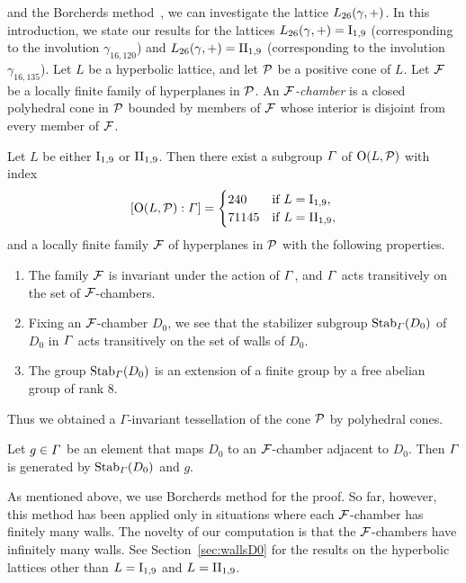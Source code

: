 \documentclass{amsart} %
\begin{document}
and the Borcherds method~\cite{MR913200, MR1654763},
we can investigate  %
the lattice $L_{26}(\gamma, +)$.
In this introduction, 
we state our results for the lattices $L_{26}(\gamma, +)=\mathrm{I}_{1,9}$ (corresponding to the involution $\gamma_{16,120}$) 
and $L_{26}(\gamma, +)=\mathrm{II}_{1,9}$ (corresponding to the involution $\gamma_{16,135}$).
Let $L$ be a hyperbolic lattice, 
and let $\mathord{\mathcal{P}}$ be a positive cone of $L$.
 Let $\mathord{\mathcal{F}}$ be a locally finite family of hyperplanes in $\mathord{\mathcal{P}}$. 
 An \emph{$\mathord{\mathcal{F}}$-chamber} is a closed polyhedral cone in $\mathord{\mathcal{P}}$ 
 bounded by members of $\mathord{\mathcal{F}}$ whose interior is disjoint from every member of $\mathord{\mathcal{F}}$.
%
%
\begin{theorem}\label{thm:main3}
Let $L$ be either $\mathrm{I}_{1,9}$ or $\mathrm{II}_{1,9}$. 
Then there exist a subgroup $\varGamma$ 
of $\mathord{\mathrm{O}}(L,\mathord{\mathcal{P}})$ with index 
\[
[\mathord{\mathrm{O}}(L,\mathord{\mathcal{P}}): \varGamma]=\begin{cases}
240 & \textrm{if $L=\mathrm{I}_{1,9}$}, \\
71145 & \textrm{if $L=\mathrm{II}_{1,9}$}, \\
\end{cases}
\]
and a locally finite family $\mathord{\mathcal{F}}$ of hyperplanes in $\mathord{\mathcal{P}}$ with the following properties.
\begin{enumerate}[label={\rm(\roman*)}]
%
\item The family $\mathord{\mathcal{F}}$ is invariant under the action of $\varGamma$, 
and $\varGamma$ acts transitively on the set of $\mathord{\mathcal{F}}$-chambers.
\item Fixing an $\mathord{\mathcal{F}}$-chamber $D_0$,
we see that the stabilizer subgroup $\operatorname{Stab}_{\varGamma}(D_0)$ of $D_0$ in $\varGamma$
 acts transitively on the set of walls of $D_0$.
 \item 
 The group 
 $\operatorname{Stab}_{\varGamma}(D_0)$ is an extension of a finite group by a free abelian group of rank $8$.
\end{enumerate}
\end{theorem}
%
Thus we obtained a $\Gamma$-invariant tessellation of the cone $\mathord{\mathcal{P}}$ by polyhedral cones.
%
\begin{corollary}\label{thm:CorOfmain3}
Let $g\in\varGamma$ be an element that maps $D_0$ to an $\mathord{\mathcal{F}}$-chamber adjacent to $D_0$. 
Then $\varGamma$ is generated by $\operatorname{Stab}_{\varGamma}(D_0)$ and $g$.
\end{corollary}
%
As mentioned above, we use  Borcherds method for the proof. 
So far, however,
 this method has been applied only in situations where each $\mathord{\mathcal{F}}$-chamber has finitely many walls. 
 The novelty of our computation is that 
 the $\mathord{\mathcal{F}}$-chambers have infinitely many walls. 
See Section~\ref{sec:wallsD0} for the results on the  hyperbolic lattices
other than $L=\mathrm{I}_{1,9}$ and $L=\mathrm{II}_{1,9}$.
%
\end{document}
